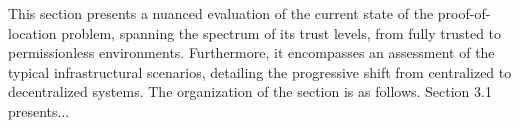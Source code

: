 This section presents a nuanced evaluation of the current state of the proof-of-location problem, spanning the spectrum of its trust levels, from fully trusted to permissionless environments. Furthermore, it encompasses an assessment of the typical infrastructural scenarios, detailing the progressive shift from centralized to decentralized systems. The organization of the section is as follows. Section 3.1 presents...

